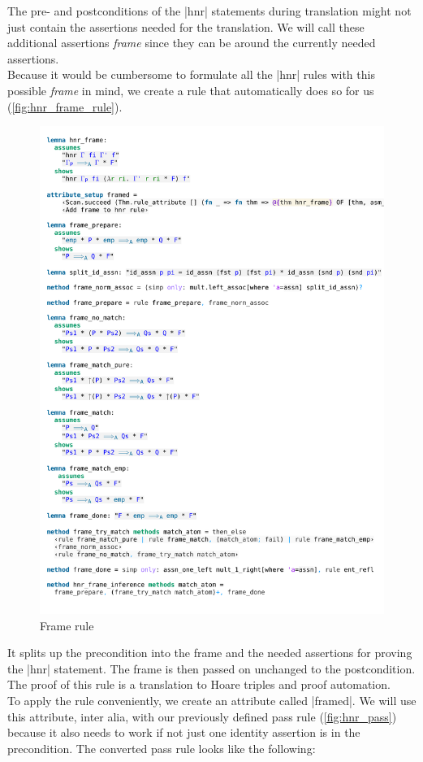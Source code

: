 The pre- and postconditions of the |hnr| statements during translation might not just contain the assertions needed for the translation. We will call these additional assertions \textit{frame} since they can be around the currently needed assertions. \\
Because it would be cumbersome to formulate all the |hnr| rules with this possible \textit{frame} in mind, we create a rule that automatically does so for us (\autoref{fig:hnr_frame_rule}).

\begin{figure}[htpb]
    \includegraphics[trim={0 26,2cm 0 0,5cm}, clip, width=1.00\textwidth]{figures/Theory_Hnr_Frame.pdf}
    \caption[Frame rule]{Frame rule}
    \label{fig:hnr_frame_rule}
\end{figure}

\noindent It splits up the precondition into the frame and the needed assertions for proving the |hnr| statement. The frame is then passed on unchanged to the postcondition.\\
The proof of this rule is a translation to Hoare triples and proof automation.\\
To apply the rule conveniently, we create an attribute called |framed|. We will use this attribute, inter alia, with our previously defined pass rule (\autoref{fig:hnr_pass}) because it also needs to work if not just one identity assertion is in the precondition.
The converted pass rule looks like the following:

